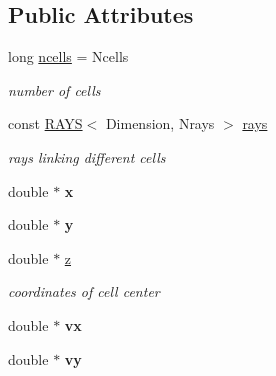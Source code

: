 \subsection*{Public Attributes}
\begin{DoxyCompactItemize}
\item 
\mbox{\label{structCELLS_aac708a2c28078bc12ba4bd24e40aa357}} 
long \mbox{\hyperlink{structCELLS_aac708a2c28078bc12ba4bd24e40aa357}{ncells}} = Ncells
\begin{DoxyCompactList}\small\item\em number of cells \end{DoxyCompactList}\item 
\mbox{\label{structCELLS_aaf512aa19804997e9db9194dac2bf5a7}} 
const \mbox{\hyperlink{structRAYS}{R\+A\+YS}}$<$ Dimension, Nrays $>$ \mbox{\hyperlink{structCELLS_aaf512aa19804997e9db9194dac2bf5a7}{rays}}
\begin{DoxyCompactList}\small\item\em rays linking different cells \end{DoxyCompactList}\item 
\mbox{\label{structCELLS_a49bbf1e6c1b6b50709b59657129d44b7}} 
double $\ast$ {\bfseries x}
\item 
\mbox{\label{structCELLS_aa734f9283fd245805ebacfef0c3f9aba}} 
double $\ast$ {\bfseries y}
\item 
\mbox{\label{structCELLS_ab7c634df2c7b5b56f45c29da2d5013e9}} 
double $\ast$ \mbox{\hyperlink{structCELLS_ab7c634df2c7b5b56f45c29da2d5013e9}{z}}
\begin{DoxyCompactList}\small\item\em coordinates of cell center \end{DoxyCompactList}\item 
\mbox{\label{structCELLS_a1cdd63e03479d67cf682ee0dec49e8d0}} 
double $\ast$ {\bfseries vx}
\item 
\mbox{\label{structCELLS_a175fa249e37b544241659b35d21d3f48}} 
double $\ast$ {\bfseries vy}
\item 
\mbox{\label{structCELLS_a5bbea38ec85a172bc1819a6d3aef4ff7}} 

\end{DoxyCompactItemize}
